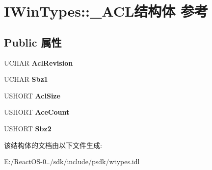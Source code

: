\hypertarget{struct_i_win_types_1_1___a_c_l}{}\section{I\+Win\+Types\+:\+:\+\_\+\+A\+C\+L结构体 参考}
\label{struct_i_win_types_1_1___a_c_l}
\subsection*{Public 属性}
\begin{DoxyCompactItemize}
\item 
\mbox{\label{struct_i_win_types_1_1___a_c_l_a4d74cfab88c7ff2733d3d9472695df35}} 
U\+C\+H\+AR {\bfseries Acl\+Revision}
\item 
\mbox{\label{struct_i_win_types_1_1___a_c_l_ae21adcfd38d81af9968d462258e9cfee}} 
U\+C\+H\+AR {\bfseries Sbz1}
\item 
\mbox{\label{struct_i_win_types_1_1___a_c_l_ad5267a7735a9f79e9bfff2519c478f95}} 
U\+S\+H\+O\+RT {\bfseries Acl\+Size}
\item 
\mbox{\label{struct_i_win_types_1_1___a_c_l_aa9671bed3f4a194a0acbc1d7a1aa5158}} 
U\+S\+H\+O\+RT {\bfseries Ace\+Count}
\item 
\mbox{\label{struct_i_win_types_1_1___a_c_l_ad564d8ce1aa26f63e7195242567ba1da}} 
U\+S\+H\+O\+RT {\bfseries Sbz2}
\end{DoxyCompactItemize}


该结构体的文档由以下文件生成\+:\begin{DoxyCompactItemize}
\item 
E\+:/\+React\+O\+S-\/0../sdk/include/psdk/wtypes.\+idl\end{DoxyCompactItemize}
